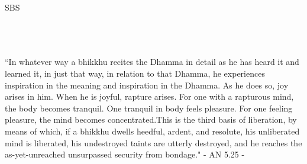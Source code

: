 \cleartorecto
\thispagestyle{empty}
\vspace*{3em}

{\centering

\settowidth{\titleLength}{%
  {\Large\chapterTitleFont\textsc{\MakeUppercase{{\thetitle}}}}%
}

{\Huge\fontsize{64}{16}\sbsFont SBS}\\[1.0\baselineskip]%

{\Huge\chapterTitleFont\textsc{{\thetitle\linebreak}}}\\[0.2\baselineskip]

\\[1.4\baselineskip]

{\Large\scshape \thesubtitle}\\[2.5\baselineskip]



{\quote “In whatever way a bhikkhu recites the Dhamma in detail as he has heard it and learned it, in just that way, in relation to that Dhamma, he experiences inspiration in the meaning and inspiration in the Dhamma. As he does so, joy arises in him. When he is joyful, rapture arises. For one with a rapturous mind, the body becomes tranquil. One tranquil in body feels pleasure. For one feeling pleasure, the mind becomes concentrated.\linebreak This is the third basis of liberation, by means of which, if a bhikkhu dwells heedful, ardent, and resolute, his unliberated mind is liberated, his undestroyed taints are utterly destroyed, and he reaches the as-yet-unreached unsurpassed security from bondage." \linebreak - AN 5.25 -}\\[1.4\baselineskip]
}
